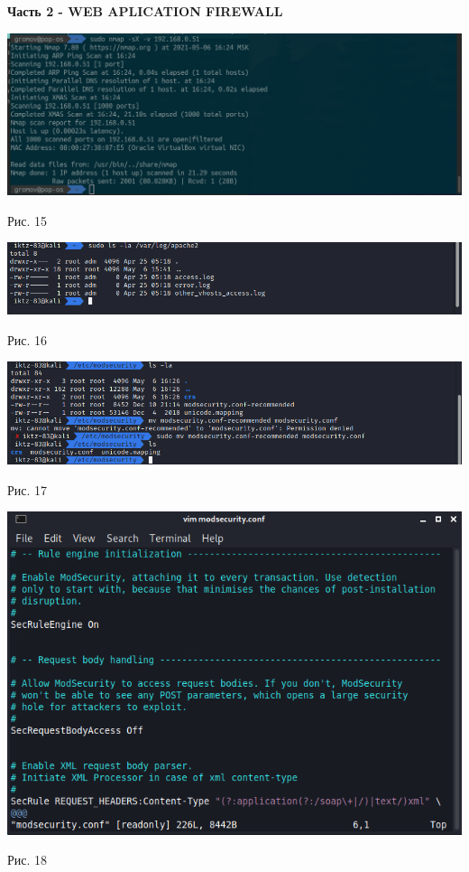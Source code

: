\documentclass[a4paper,14pt]{extarticle}
\begin{document}
    \newpage
    \textbf{Часть 2 - WEB APLICATION FIREWALL}
    \begin{center}

        \includegraphics[scale=0.42]{pics/14.png}

        Рис. 15

        \includegraphics[scale=0.5]{pics/15.png}

        Рис. 16

        \includegraphics[scale=0.5]{pics/16.png}

        Рис. 17

        \includegraphics[scale=0.6]{pics/17.png}

        Рис. 18
    \end{center}
\end{document}
